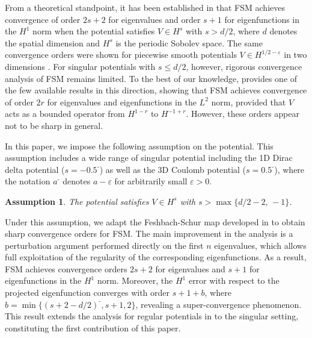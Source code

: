 \documentclass{sn-jnl}%
\newcommand{\m}{\textbf{-}}
\numberwithin{equation}{section}
\theoremstyle{thmstyleone}%
\newtheorem{assumption}{Assumption}
\theoremstyle{thmstyletwo}%
\theoremstyle{thmstylethree}%
\begin{document}
From a theoretical standpoint, it has been established in \cite{cances2010THM} that FSM achieves convergence of order $2s+2$ for eigenvalues and order $s+1$ for eigenfunctions in the $H^1$ norm when the potential satisfies $V\in H^{s}$ with $s>d/2$, where $d$ denotes the spatial dimension and $H^{s}$ is the periodic Sobolev space. The same convergence orders were shown for piecewise smooth potentials $V\in H^{1/2-\varepsilon}$ in two dimensions \cite{norton2010FSM-Theorem}. For singular potentials with $s\le d/2$, however, rigorous convergence analysis of FSM remains limited. To the best of our knowledge, \cite{dusson2023FSM-Theorem} provides one of the few available results in this direction, showing that FSM achieves convergence  of order $2r$ for eigenvalues and eigenfunctions in the $L^2$ norm, provided that $V$ acts as a bounded operator from $H^{1-r}$ to $H^{-1+r}$. However, these orders appear not to be sharp in general.

In this paper, we impose the following assumption on the potential. This assumption includes a wide range of singular potential including the 1D Dirac delta potential ($s=-0.5^{\m}$) as well as the 3D Coulomb potential ($s=0.5^{\m}$), where the notation $a^{\m}$ denotes $a-\varepsilon$ for arbitrarily small $\varepsilon>0$.
\begin{assumption}\label{Asp::FSM}
The potential satisfies $V \in H^s$ with $s > \max\{d/2-2,\,-1\}$.
\end{assumption}

Under this assumption, we adapt the Feshbach-Schur map  developed in \cite{dusson2023FSM-Theorem} to obtain sharp convergence orders for FSM. The main improvement in the analysis is a perturbation argument performed directly on the first $n$ eigenvalues, which allows full exploitation of the regularity of the corresponding eigenfunctions. As a result, FSM achieves convergence orders $2s+2$ for eigenvalues and $s+1$ for eigenfunctions in the $H^1$ norm. Moreover, the $H^1$ error with respect to the projected eigenfunction converges with order $s+1+b$, where $b=\min\{(s+2-d/2)^{\m},s+1,2\}$, revealing a super-convergence phenomenon. This result extends the analysis for regular potentials in \cite{cances2010THM,cances2018THM} to the singular setting, constituting the first contribution of this paper.
\end{document}

